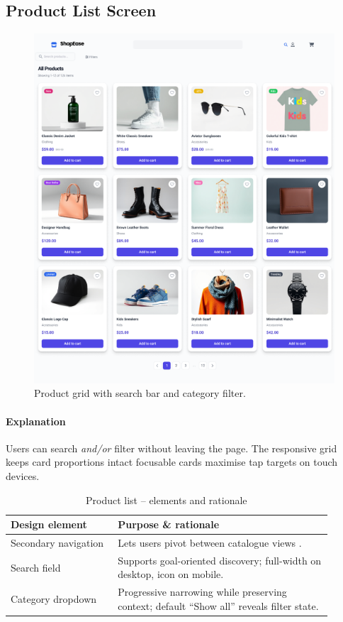 \documentclass[11pt,a4paper]{article}
\begin{document}
\subsection{Product List Screen}

\begin{figure}[H]
	\centering
	\includegraphics[width=\linewidth]{pictures/main/Product_List_Figma}%
	\caption{Product grid with search bar and category filter.}
	\label{fig:ui-products}
\end{figure}

\paragraph{Explanation}%
Users can search \emph{and/or} filter without leaving the page.  
The responsive grid keeps card proportions intact  focusable
cards maximise tap targets on touch devices.

\begin{table}[H]
	\centering
	\caption{Product list – elements and rationale}
	\label{tab:product-elements}
	\begin{tabular}{p{0.30\linewidth} p{0.60\linewidth}}
		\toprule
		\textbf{Design element} & \textbf{Purpose \& rationale} \\ \midrule
		Secondary navigation    & Lets users pivot between catalogue views .\\
		Search field            & Supports goal-oriented discovery; full-width on desktop, icon on mobile.\\
		Category dropdown       & Progressive narrowing while preserving context; default “Show all” reveals filter state.\\
	
	
		\bottomrule
	\end{tabular}
\end{table}
\end{document}

